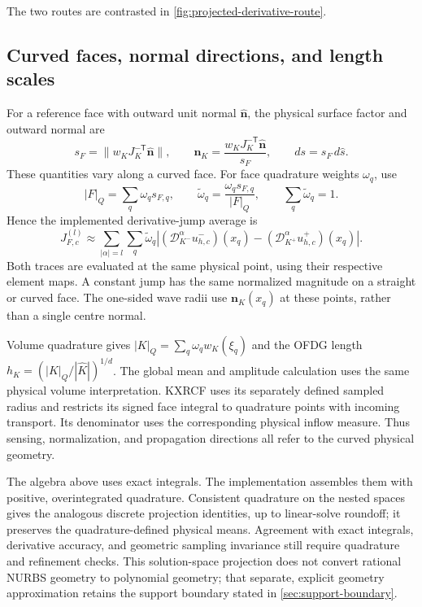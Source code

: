 The two routes are contrasted in \cref{fig:projected-derivative-route}.


\subsection{Curved faces, normal directions, and length scales}
For a reference face with outward unit normal $\widehat{\boldsymbol n}$, the
physical surface factor and outward normal are
\begin{equation}
 s_F=\|w_KJ_K^{-\mathsf T}\widehat{\boldsymbol n}\|,
 \qquad \boldsymbol n_K=
 \frac{w_KJ_K^{-\mathsf T}\widehat{\boldsymbol n}}{s_F},
 \qquad ds=s_F\,d\widehat s.
 \label{eq:curved-face-metric}
\end{equation}
These quantities vary along a curved face. For face quadrature weights
$\omega_q$, use
\begin{equation}
 |F|_Q=\sum_q\omega_qs_{F,q},\qquad
 \widetilde\omega_q=\frac{\omega_qs_{F,q}}{|F|_Q},\qquad
 \sum_q\widetilde\omega_q=1.
 \label{eq:curved-face-normalization}
\end{equation}
Hence the implemented derivative-jump average is
\begin{equation}
 J_{F,c}^{(l)}\approx\sum_{|\alpha|=l}\sum_q\widetilde\omega_q
 \left| (\mathscr D_{K^-}^{\alpha}u_{h,c}^-)(x_q)
       -(\mathscr D_{K^+}^{\alpha}u_{h,c}^+)(x_q)\right|.
\end{equation}
Both traces are evaluated at the same physical point, using their respective
element maps. A constant jump has the same normalized magnitude on a straight
or curved face. The one-sided wave radii use $\boldsymbol n_K(x_q)$ at these
points, rather than a single centre normal.

Volume quadrature gives $|K|_Q=\sum_q\omega_qw_K(\xi_q)$ and the OFDG length
$h_K=(|K|_Q/|\widehat K|)^{1/d}$. The global mean and amplitude calculation
uses the same physical volume interpretation. KXRCF uses its separately defined
sampled radius and restricts its signed face integral to quadrature points
with incoming transport. Its denominator uses the corresponding physical
inflow measure. Thus sensing, normalization, and propagation directions all
refer to the curved physical geometry.

The algebra above uses exact integrals. The implementation assembles them
with positive, overintegrated quadrature. Consistent quadrature on the nested
spaces gives the analogous discrete projection identities, up to linear-solve
roundoff; it preserves the quadrature-defined physical means. Agreement with
exact integrals, derivative accuracy, and geometric sampling invariance still
require quadrature and refinement checks. This solution-space
projection does not convert rational NURBS geometry to polynomial geometry;
that separate, explicit geometry approximation retains the support boundary
stated in \cref{sec:support-boundary}.
